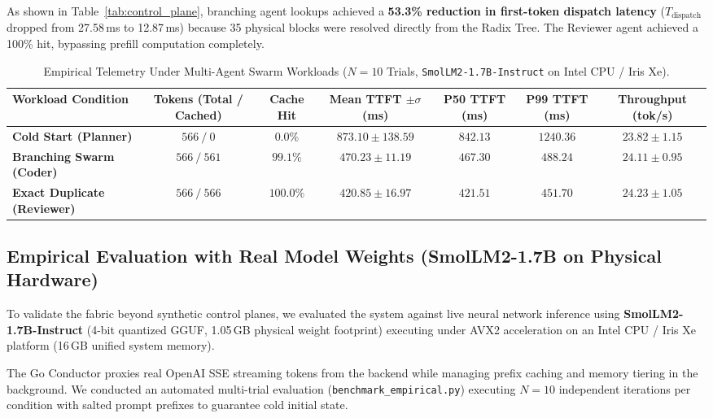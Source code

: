\documentclass[10pt,twocolumn,letterpaper]{article}
\begin{document}
As shown in Table~\ref{tab:control_plane}, branching agent lookups achieved a \textbf{53.3\% reduction in first-token dispatch latency} ($T_{\text{dispatch}}$ dropped from 27.58\,ms to 12.87\,ms) because 35 physical blocks were resolved directly from the Radix Tree. The Reviewer agent achieved a 100\% hit, bypassing prefill computation completely.

\begin{table}[t]
\centering
\small
\caption{Empirical Telemetry Under Multi-Agent Swarm Workloads ($N=10$ Trials, \texttt{SmolLM2-1.7B-Instruct} on Intel CPU / Iris Xe).}
\label{tab:empirical_results}
\begin{tabular}{lcccccc}
\toprule
\textbf{Workload Condition} & \textbf{Tokens (Total / Cached)} & \textbf{Cache Hit} & \textbf{Mean TTFT $\pm \sigma$ (ms)} & \textbf{P50 TTFT (ms)} & \textbf{P99 TTFT (ms)} & \textbf{Throughput (tok/s)} \\
\midrule
\textbf{Cold Start (Planner)}       & $566\ /\ 0$   & $0.0\%$   & $873.10 \pm 138.59$ & $842.13$ & $1240.36$ & $23.82 \pm 1.15$ \\
\textbf{Branching Swarm (Coder)}    & $566\ /\ 561$ & $99.1\%$  & $470.23 \pm 11.19$  & $467.30$ & $488.24$  & $24.11 \pm 0.95$ \\
\textbf{Exact Duplicate (Reviewer)} & $566\ /\ 566$ & $100.0\%$ & $420.85 \pm 16.97$  & $421.51$ & $451.70$  & $24.23 \pm 1.05$ \\
\bottomrule
\end{tabular}
\end{table}

\subsection{Empirical Evaluation with Real Model Weights (SmolLM2-1.7B on Physical Hardware)}
To validate the fabric beyond synthetic control planes, we evaluated the system against live neural network inference using \textbf{SmolLM2-1.7B-Instruct} (4-bit quantized GGUF, 1.05\,GB physical weight footprint) executing under AVX2 acceleration on an Intel CPU / Iris Xe platform (16\,GB unified system memory).

The Go Conductor proxies real OpenAI SSE streaming tokens from the backend while managing prefix caching and memory tiering in the background. We conducted an automated multi-trial evaluation (\texttt{benchmark\_empirical.py}) executing $N = 10$ independent iterations per condition with salted prompt prefixes to guarantee cold initial state.
\end{document}
